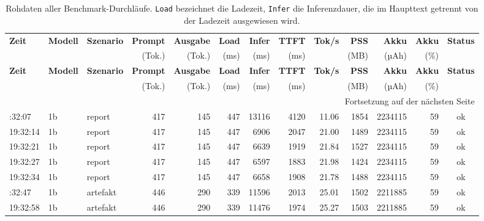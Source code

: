 {\scriptsize
\setlength{\tabcolsep}{3pt}
\renewcommand{\arraystretch}{1.1}
\begin{longtable}{lllrrrrrrrrrc}
\caption[Rohdaten der Messungen]{Rohdaten aller Benchmark-Durchläufe. \texttt{Load} bezeichnet die Ladezeit, \texttt{Infer} die Inferenzdauer, die im Haupttext getrennt von der Ladezeit ausgewiesen wird.}
\label{tab:app-rohdaten}\\
\toprule
\textbf{Zeit} & \textbf{Modell} & \textbf{Szenario} & \textbf{Prompt} & \textbf{Ausgabe} & \textbf{Load} & \textbf{Infer} & \textbf{TTFT} & \textbf{Tok/s} & \textbf{PSS} & \textbf{Akku} & \textbf{Akku} & \textbf{Status} \\
              &                &                   & \scriptsize(Tok.) & \scriptsize(Tok.) & \scriptsize(ms) & \scriptsize(ms) & \scriptsize(ms) & & \scriptsize(MB) & \scriptsize(µAh) & \scriptsize(\%) & \\
\midrule
\endfirsthead
\toprule
\textbf{Zeit} & \textbf{Modell} & \textbf{Szenario} & \textbf{Prompt} & \textbf{Ausgabe} & \textbf{Load} & \textbf{Infer} & \textbf{TTFT} & \textbf{Tok/s} & \textbf{PSS} & \textbf{Akku} & \textbf{Akku} & \textbf{Status} \\
              &                &                   & \scriptsize(Tok.) & \scriptsize(Tok.) & \scriptsize(ms) & \scriptsize(ms) & \scriptsize(ms) & & \scriptsize(MB) & \scriptsize(µAh) & \scriptsize(\%) & \\
\midrule
\endhead
\midrule
\multicolumn{13}{r}{\scriptsize Fortsetzung auf der nächsten Seite}\\
\endfoot
\bottomrule
\endlastfoot
19:32:07 & 1b   & report    & 417 & 145 & 447 & 13116 & 4120  & 11.06 & 1854 & 2234115 & 59 & ok \\
19:32:14 & 1b   & report    & 417 & 145 & 447 &  6906 & 2047  & 21.00 & 1489 & 2234115 & 59 & ok \\
19:32:21 & 1b   & report    & 417 & 145 & 447 &  6639 & 1919  & 21.84 & 1527 & 2234115 & 59 & ok \\
19:32:27 & 1b   & report    & 417 & 145 & 447 &  6597 & 1883  & 21.98 & 1424 & 2234115 & 59 & ok \\
19:32:34 & 1b   & report    & 417 & 145 & 447 &  6658 & 1908  & 21.78 & 1488 & 2234115 & 59 & ok \\
\addlinespace
19:32:47 & 1b   & artefakt  & 446 & 290 & 339 & 11596 & 2013  & 25.01 & 1502 & 2211885 & 59 & ok \\
19:32:58 & 1b   & artefakt  & 446 & 290 & 339 & 11476 & 1974  & 25.27 & 1503 & 2211885 & 59 & ok \\

\end{longtable}}
